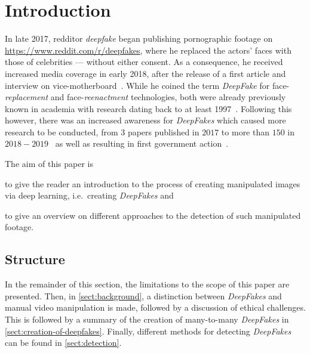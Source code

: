 \section{Introduction}
In late 2017, \gls{redditor} \textit{deepfake} began publishing pornographic footage
on \url{https://www.reddit.com/r/deepfakes}, where he replaced the actors' faces
with those of celebrities --- without either consent. As a consequence, he
received increased media coverage in early 2018, after the release of a first 
article and interview on vice-motherboard~\cite{Cole.2017}. While he coined the
term \textit{DeepFake} for face-\textit{replacement} and face-\textit{reenactment}
technologies, both were already previously known in academia with research 
dating back to at least 1997~\cite{Bregler.1997}.
Following this however, there was an increased awareness for \textit{DeepFakes}
which caused more research to be conducted, from \(3\) papers published in
\(2017\) to more than \(150\) in \(2018-2019\)~\cite{Mirsky.2020} as
well as resulting in first government action~\cite{senate_-_homeland_security_and_governmental_affairs_deepfake_2019}.

\par
The aim of this paper is
\begin{enumerate*}[a.)]
    \item to give the reader an introduction to the process of creating manipulated
    images via deep learning, i.e.\ creating \textit{DeepFakes} and
    \item to give an overview on different approaches to the detection of such
    manipulated footage.
\end{enumerate*}

\subsection{Structure}
In the remainder of this section, the limitations to the scope of this paper are
presented. Then, in \cref{sect:background}, a distinction between \textit{DeepFakes}
and manual video manipulation is made, followed by a discussion of ethical challenges.
This is followed by a summary of the creation of many-to-many \textit{DeepFakes}
in \cref{sect:creation-of-deepfakes}. Finally, different methods for detecting
\textit{DeepFakes} can be found in \cref{sect:detection}.

